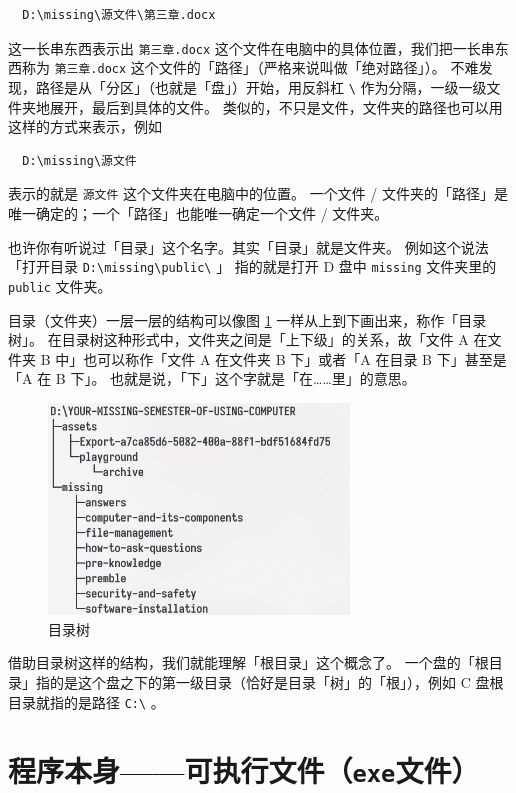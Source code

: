 \begin{verbatim}
  D:\missing\源文件\第三章.docx
\end{verbatim}

这一长串东西表示出 \verb|第三章.docx| 这个文件在电脑中的具体位置，我们把一长串东西称为 \verb|第三章.docx| 这个文件的「路径」（严格来说叫做「绝对路径」）。
不难发现，路径是从「分区」（也就是「盘」）开始，用反斜杠 \verb|\| 作为分隔，一级一级文件夹地展开，最后到具体的文件。
类似的，不只是文件，文件夹的路径也可以用这样的方式来表示，例如

\begin{verbatim}
  D:\missing\源文件
\end{verbatim}

表示的就是 \verb|源文件| 这个文件夹在电脑中的位置。
一个文件 / 文件夹的「路径」是唯一确定的；一个「路径」也能唯一确定一个文件 / 文件夹。

也许你有听说过「目录」这个名字。其实「目录」就是文件夹。
例如这个说法「打开目录 \verb|D:\missing\public\| 」 指的就是打开 D 盘中 \verb|missing| 文件夹里的 \verb|public| 文件夹。

目录（文件夹）一层一层的结构可以像图 \ref{Catalog_Tree} 一样从上到下画出来，称作「目录树」。
在目录树这种形式中，文件夹之间是「上下级」的关系，故「文件 A 在文件夹 B 中」也可以称作「文件 A 在文件夹 B 下」或者「A 在目录 B 下」甚至是「A 在 B 下」。
也就是说，「下」这个字就是「在……里」的意思。

\begin{figure}[htb!]
  \centering
  \includegraphics[width=8cm]{assets/Catalog_Tree.png}
  \caption{目录树}
  \label{Catalog_Tree}
\end{figure}

借助目录树这样的结构，我们就能理解「根目录」这个概念了。
一个盘的「根目录」指的是这个盘之下的第一级目录（恰好是目录「树」的「根」），例如 C 盘根目录就指的是路径 \verb|C:\| 。

\section{程序本身——可执行文件（\texttt{exe}文件）}

